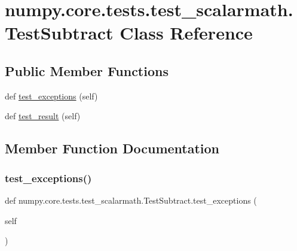 \hypertarget{classnumpy_1_1core_1_1tests_1_1test__scalarmath_1_1TestSubtract}{}\section{numpy.\+core.\+tests.\+test\+\_\+scalarmath.\+Test\+Subtract Class Reference}
\label{classnumpy_1_1core_1_1tests_1_1test__scalarmath_1_1TestSubtract}
\subsection*{Public Member Functions}
\begin{DoxyCompactItemize}
\item 
def \hyperlink{classnumpy_1_1core_1_1tests_1_1test__scalarmath_1_1TestSubtract_a21893090b193d0d4511f4405398634d4}{test\+\_\+exceptions} (self)
\item 
def \hyperlink{classnumpy_1_1core_1_1tests_1_1test__scalarmath_1_1TestSubtract_a870a1e3e41e2d729632410ea8554a6f7}{test\+\_\+result} (self)
\end{DoxyCompactItemize}


\subsection{Member Function Documentation}
\mbox{\label{classnumpy_1_1core_1_1tests_1_1test__scalarmath_1_1TestSubtract_a21893090b193d0d4511f4405398634d4}} 
\subsubsection{\texorpdfstring{test\+\_\+exceptions()}{test\_exceptions()}}
{\footnotesize\ttfamily def numpy.\+core.\+tests.\+test\+\_\+scalarmath.\+Test\+Subtract.\+test\+\_\+exceptions (\begin{DoxyParamCaption}\item[{}]{self }\end{DoxyParamCaption})}

